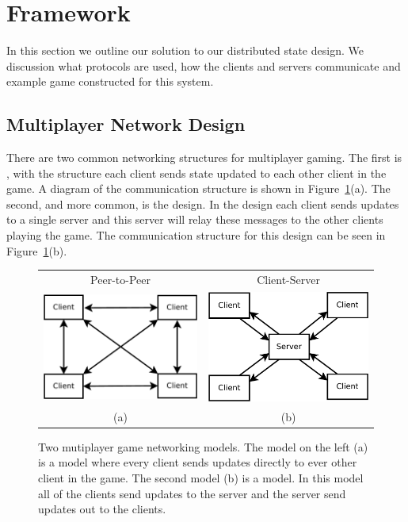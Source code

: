 
\section{Framework}
\label{sec:framework}

	In this section we outline our solution to our distributed state design. We discussion what protocols are used, how the clients and servers communicate and example game constructed for this system.

\subsection{Multiplayer Network Design}

	There are two common networking structures for multiplayer gaming. The first is \ptoP, with the structure each client sends state updated to each other client in the game. A diagram of the \ptoP communication structure is shown in Figure~\ref{figure:p2p-vs-ClientServer}(a).
	The second, and more common, is the \clientServer design. In the \clientServer design each client sends updates to a single server and this server will relay these messages to the other clients playing the game. The communication structure for this design can be seen in Figure~\ref{figure:p2p-vs-ClientServer}(b).
	
\begin{figure}[ht]
	\centering
	\begin{tabular}{c c}
		Peer-to-Peer & Client-Server \\
		\includegraphics[width=0.48\linewidth]{../images/p2p-model-crop.pdf} &
		\includegraphics[width=0.48\linewidth]{../images/client-server-model-crop.pdf} \\
		(a) & (b)
	\end{tabular}

	\caption{\label{figure:p2p-vs-ClientServer} Two mutiplayer game networking models. The model on the left (a) is a \ptoP model where every client sends updates directly to ever other client in the game. The second model (b) is a \clientServer model. In this model all of the clients send updates to the server and the server send updates out to the clients.}
	\end{figure}
	
